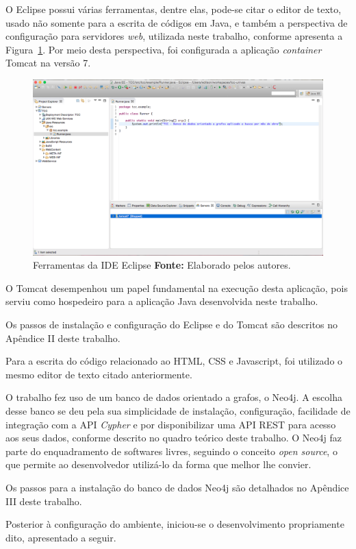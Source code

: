 
\par O Eclipse possui várias ferramentas, dentre elas, pode-se citar o editor de texto, usado não somente para a escrita de códigos em Java, e também a perspectiva de configuração para servidores \textit{web}, utilizada neste trabalho, conforme apresenta a Figura~\ref{fig:ide_eclipse}. Por meio desta perspectiva, foi configurada a aplicação \textit{container} Tomcat na versão 7.

\begin{figure}[h!]
	\centerline{\includegraphics[scale=0.3]{./imagens/eclipse-editor-texto.png}}
	\caption[Ferramentas da IDE Eclipse]
	{Ferramentas da IDE Eclipse \textbf{Fonte:} Elaborado pelos autores.}
	\label{fig:ide_eclipse}
\end{figure}

\par O Tomcat desempenhou um papel fundamental na execução desta aplicação, pois serviu como hospedeiro para a aplicação Java desenvolvida neste trabalho. 

\par Os passos de instalação e configuração do Eclipse e do Tomcat são descritos no Apêndice II deste trabalho.

\par Para a escrita do código relacionado ao HTML, CSS e Javascript, foi utilizado o mesmo editor de texto citado anteriormente.

\par O trabalho fez uso de um banco de dados orientado a grafos, o Neo4j. A escolha desse banco se deu pela sua simplicidade de instalação, configuração, facilidade de integração com a API \textit{Cypher} e por disponibilizar uma API REST para acesso aos seus dados, conforme descrito no quadro teórico deste trabalho. O Neo4j faz parte do enquadramento de softwares livres, seguindo o conceito \textit{open source}, o que permite ao desenvolvedor utilizá-lo da forma que melhor lhe convier. 

\par Os passos para a instalação do banco de dados Neo4j são detalhados no Apêndice III deste trabalho.

\par Posterior à configuração do ambiente, iniciou-se o desenvolvimento propriamente dito, apresentado a seguir.
